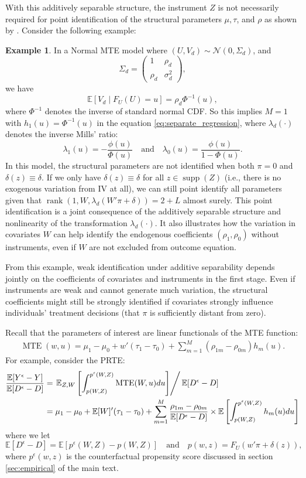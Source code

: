 \documentclass[11pt]{article}
\theoremstyle{definition}
\newtheorem{example}{Example}[section]
\DeclareMathOperator*{\rank}{rank}
\DeclareMathOperator*{\supp}{supp}
\DeclareMathOperator*{\MTE}{MTE}
\newcommand{\Exp}{\ensuremath{\mathbb{E}}} %
\newcommand{\0}{\ensuremath{\mathbf{0}}}
\newcommand{\normal}{\ensuremath{\mathcal{N}}}
\begin{document}
\begin{bibunit}
With this additively separable structure, the instrument $Z$ is not necessarily required for point identification of the structural parameters $\mu, \tau$, and $\rho$ as shown by \citet{pan/wang/zhang/zhou:2024}. Consider the following example:

\begin{example}
In a Normal MTE model where $(U,V_d) \sim \normal(0,\Sigma_d)$, and
\[
	\Sigma_d = 
	\begin{pmatrix}
		1 & \rho_d \\
		\rho_d & \sigma_d^2
	\end{pmatrix},
\]
we have
\[
	\Exp[V_d\mid F_U(U) = u] = \rho_d \Phi^{-1}(u),
\]
where $\Phi^{-1}$ denotes the inverse of standard normal CDF. 
So this implies $M = 1$ with $h_1(u) = \Phi^{-1}(u)$ in the equation \eqref{eq:separate_regression}, 
where $\lambda_d(\cdot)$ denotes the inverse Mills' ratio:
\[
	\lambda_1(u) = - \frac{\phi(u)}{\Phi(u)} 
	\quad\text{and}\quad
	\lambda_0(u) = \frac{\phi(u)}{1-\Phi(u)}.
\]
In this model, the structural parameters are not identified when both $\pi = 0$ and $\delta(z) \equiv \delta$. If we only have $\delta(z) \equiv \delta$ for all $z\in \supp(Z)$ (i.e., there is no exogenous variation from IV at all), we can still point identify all parameters given that $\rank(1, W, \lambda_d(W'\pi + \delta)) = 2+L$ almost surely. This point identification is a joint consequence of the additively separable structure and nonlinearity of the transformation $\lambda_d(\cdot)$. It also illustrates how the variation in covariates $W$ can help identify the endogenous coefficients $(\rho_1, \rho_0)$ without instruments, even if $W$ are not excluded from outcome equation. 
\end{example}
From this example, weak identification under additive separability depends jointly on the coefficients of covariates and instruments in the first stage. Even if instruments are weak and cannot generate much variation, the structural coefficients might still be strongly identified if covariates strongly influence individuals' treatment decisions (that $\pi$ is sufficiently distant from zero).

Recall that the parameters of interest are linear functionals of the MTE function:
\begin{align*}
	\MTE(w,u) = \mu_1 - \mu_0 + w'(\tau_1 - \tau_0) + \sum_{m=1}^M (\rho_{1m} - \rho_{0m}) h_m(u).
\end{align*}
For example, consider the PRTE:
\begin{align*}
	\frac{\Exp [Y^\epsilon - Y]}{\Exp [D^\epsilon - D]}
	&= \left.\Exp_{Z,W}\left[\int_{p(W,Z)}^{p^\epsilon(W,Z)} \MTE(W,u) du\right]\right/\Exp[D^\epsilon - D] \\
	&= \mu_1 - \mu_0 + \Exp[W]'(\tau_1 - \tau_0) + \sum_{m=1}^M\frac{\rho_{1m} - \rho_{0m}}{\Exp[D^\epsilon - D]}\times \Exp\left[\int_{p(W,Z)}^{p^\epsilon(W,Z)}h_m(u) du\right]
\end{align*}
where we let 
\[
	\Exp[D^\epsilon - D] = \Exp[p^\epsilon(W,Z) - p(W,Z)] \quad
	\text{and} \quad p(w,z) = F_U(w'\pi + \delta(z)),
\]
where $p^\epsilon(w,z)$ is the counterfactual propensity score discussed in section \ref{sec:empirical} of the main text.


\end{bibunit}
\end{document}
